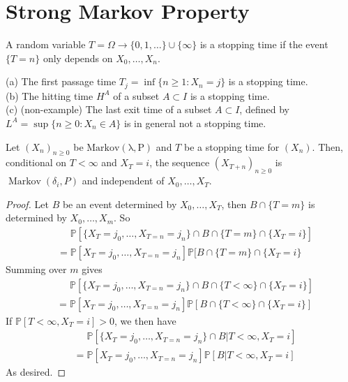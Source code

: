 \section{Strong Markov Property}
\begin{definition}
    A random variable $T=\Omega\to\{0,1,\ldots\}\cup\{\infty\}$ is a stopping time if the event $\{T=n\}$ only depends on $X_0,\ldots,X_n$.
\end{definition}
\begin{example}
    (a) The first passage time $T_j=\inf\{n\ge 1:X_n=j\}$ is a stopping time.\\
    (b) The hitting time $H^A$ of a subset $A\subset I$ is a stopping time.\\
    (c) (non-example) The last exit time of a subset $A\subset I$, defined by $L^A=\sup\{n\ge 0:X_n\in A\}$ is in general not a stopping time.
\end{example}
\begin{theorem}\label{strong_markov}
    Let $(X_n)_{n\ge 0}$ be $\operatorname{Markov(\lambda,P)}$ and $T$ be a stopping time for $(X_n)$.
    Then, conditional on $T<\infty$ and $X_T=i$, the sequence $(X_{T+n})_{n\ge 0}$ is $\operatorname{Markov}(\delta_i,P)$ and independent of $X_0,\ldots,X_T$.
\end{theorem}
\begin{proof}
    Let $B$ be an event determined by $X_0,\ldots,X_T$, then $B\cap\{T=m\}$ is determined by $X_0,\ldots,X_m$.
    So
    \begin{align*}
        &\phantom{=}\mathbb P[\{X_T=j_0,\ldots,X_{T=n}=j_n\}\cap B\cap\{T=m\}\cap\{X_T=i\}]\\
        &=\mathbb P[X_T=j_0,\ldots,X_{T=n}=j_n]\mathbb P[B\cap\{T=m\}\cap\{X_T=i\}
    \end{align*}
    Summing over $m$ gives
    \begin{align*}
        &\phantom{=}\mathbb P[\{X_T=j_0,\ldots,X_{T=n}=j_n\}\cap B\cap\{T<\infty\}\cap\{X_T=i\}]\\
        &=\mathbb P[X_T=j_0,\ldots,X_{T=n}=j_n]\mathbb P[B\cap\{T<\infty\}\cap\{X_T=i\}]
    \end{align*}
    If $\mathbb P[T<\infty,X_T=i]>0$, we then have
    \begin{align*}
        &\phantom{=}\mathbb P[\{X_T=j_0,\ldots,X_{T=n}=j_n\}\cap B|T<\infty,X_T=i]\\
        &=\mathbb P[X_T=j_0,\ldots,X_{T=n}=j_n]\mathbb P[B|T<\infty,X_T=i]
    \end{align*}
    As desired.
\end{proof}

